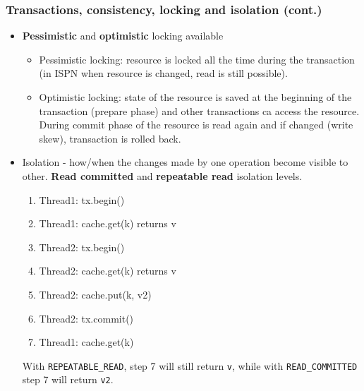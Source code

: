 \documentclass[10pt,utf8]{beamer}
\begin{document}
\begin{frame}
	\frametitle{Transactions, consistency, locking and isolation (cont.)}
	\begin{itemize}
		\item \textbf{Pessimistic} and \textbf{optimistic} locking available
		\begin{itemize}
		\pause
		\item Pessimistic locking: resource is locked all the time during the transaction (in ISPN when resource is changed, read is still possible).
		\pause
		\item Optimistic locking: state of the resource is saved at the beginning of the transaction (prepare phase) and other transactions ca access the resource. During commit phase of the resource 
		is read again and if changed (write skew), transaction is rolled back.
		\end{itemize}
		\pause
		\item Isolation - how/when the changes made by one operation become visible to other. \textbf{Read committed} and \textbf{repeatable read} isolation levels.
			\begin{enumerate}
				\pause
				\item \color{MyDarkGreen}Thread1: tx.begin()
				\pause
				\item Thread1: cache.get(k) returns v
				\pause
				\item \color{magenta}Thread2: tx.begin()
				\pause
				\item Thread2: cache.get(k) returns v
				\pause
				\item Thread2: cache.put(k, v2)
				\pause
				\item Thread2: tx.commit()
				\pause
				\item \color{MyDarkGreen}Thread1: cache.get(k)
				\pause
			\end{enumerate}
			With \texttt{REPEATABLE\_READ}, step 7 will still return \texttt{v}, while with \texttt{READ\_COMMITTED} step 7 will return \texttt{v2}.
	\end{itemize}
\end{frame}
\end{document}
